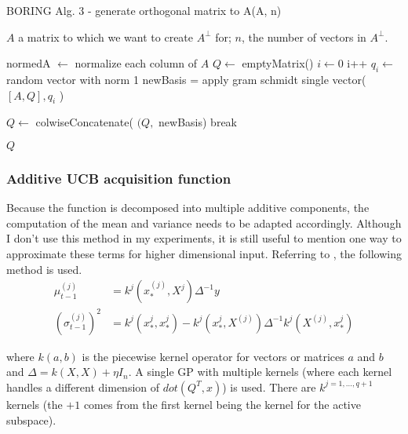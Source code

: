 \begin{algorithm}[H]
\caption{BORING Alg. 3 - generate orthogonal matrix to A(A, n) }

\begin{algorithmic} 
\REQUIRE $A$ a matrix to which we want to create $A^{\bot}$ for; $n$, the number of vectors in $A^{\bot}$.

\STATE normedA $ \leftarrow $ normalize each column of $A$
\STATE $Q \leftarrow$ emptyMatrix()
\STATE $i \leftarrow 0$ 
\STATE i++
\STATE $q_i \leftarrow $ random vector with norm 1
\STATE newBasis = apply gram schmidt single vector( $[A, Q], q_i$ ) 

\STATE $Q \leftarrow$ colwiseConcatenate( $(Q, $ newBasis)
\STATE break
\ENDIF
\ENDWHILE                
\ENDFOR

\RETURN $Q$
\end{algorithmic}
\end{algorithm}

\subsubsection{Additive UCB acquisition function}

Because the function is decomposed into multiple additive components, the computation of the mean and variance needs to be adapted accordingly. 
Although I don't use this method in my experiments, it is still useful to mention one way to approximate these terms for higher dimensional input.
Referring to \citep{Rolland}, the following method is used. \\

\begin{align}
\mu_{t-1}^{(j)} &= k^j(x_*^{(j)}, X^j)\Delta^{-1}y \\
\left( \sigma_{t-1}^{(j)} \right)^2 &= k^j(x_*^{j}, x_*^{j}) - k^j(x_*^j, X^{(j)}) \Delta^{-1} k^j(X^{(j)}, x_*^j)
\end{align}

where $k(a, b)$ is the piecewise kernel operator for vectors or matrices $a$ and $b$ and $\Delta = k(X, X) + \eta I_n$.
A single GP with multiple kernels (where each kernel handles a different dimension of $dot(Q^T, x)$) is used.
There are $k^{j=1, \ldots, q+1}$ kernels (the $+1$ comes from the first kernel being the kernel for the active subspace). \\

